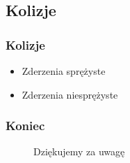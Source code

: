 \documentclass{beamer}
\begin{document}
\subsection{Kolizje}
\frame
{
	\frametitle{Kolizje}
	\begin{itemize}
	\item{Zderzenia sprężyste}
	\item{Zderzenia niesprężyste}
	\end{itemize}
}

\frame
{
	\frametitle{Koniec}
	\begin{figure}
	\centering
		Dziękujemy za uwagę
		\end{figure}
}



\end{document}

